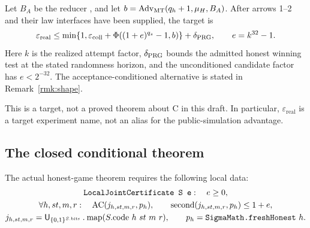 \begin{mdframed}[nobreak=true,linewidth=0.6pt,innerleftmargin=6pt,innerrightmargin=6pt]
\begin{target}\label{target:main}
Let $B_A$ be the reducer , and let
$b=\operatorname{Adv}_{\mathrm{MT}}(q_h+1,\mu_H,B_A)$. After arrows 1--2 and their
law interfaces have been supplied, the target is
\begin{equation}\label{eq:target}
 \varepsilon_{\mathrm{real}}
 \leq \min\{1,\varepsilon_{\mathrm{coll}}+\Phi((1+e)^{q_s}-1,b)\}+\delta_{\mathrm{PRG}},
 \qquad e=k^{32}-1.
\end{equation}
Here $k$ is the realized attempt factor, $\delta_{\mathrm{PRG}}$ bounds the admitted
honest winning test at the stated randomness horizon, and the
unconditioned candidate factor has $e<2^{-32}$. The acceptance-conditioned
alternative is stated in Remark~\ref{rmk:shape}.
\end{target}
\end{mdframed}
This is a target, not a proved theorem about C in this draft.
In particular, $\varepsilon_{\mathrm{real}}$ is a target experiment name,
not an alias for the public-simulation advantage.

\subsection{The closed conditional theorem}
The actual honest-game theorem requires the following local data:
\begin{equation}\label{eq:cert}
 \begin{gathered}
 \code{LocalJointCertificate S e}:\quad e\geq0,\\
 \forall h,st,m,r:\quad
  \AC(j_{h,st,m,r},p_h),\qquad
  \Second(j_{h,st,m,r},p_h)\leq1+e,\\
 j_{h,st,m,r}=\U_{\{0,1\}^{S.\mathrm{bits}}}\mathbin{.}\mathrm{map}
       (S.\mathrm{code}\ h\ st\ m\ r),\qquad
 p_h=\code{SigmaMath.freshHonest}\ h.
 \end{gathered}
\end{equation}

